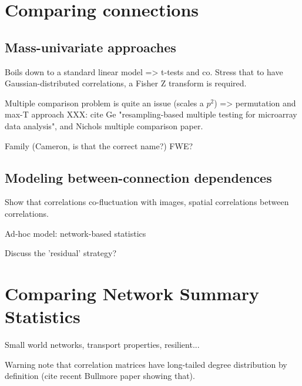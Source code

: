 \documentclass[5p]{elsarticle}
\begin{document}

\section{Comparing connections}

\subsection{Mass-univariate approaches}

Boils down to a standard linear model => t-tests and co.
Stress that to have Gaussian-distributed correlations, a Fisher Z
transform is required.

Multiple comparison problem is quite an issue (scales a $p^2$) =>
permutation and max-T approach XXX: cite Ge
"resampling-based multiple testing for microarray data analysis", and
Nichols multiple comparison paper.

Family (Cameron, is that the correct name?) FWE?

\subsection{Modeling between-connection dependences}

Show that correlations co-fluctuation with images, spatial correlations between correlations.

Ad-hoc model: network-based statistics \cite{zalesky2010}

Discuss the 'residual' strategy?
\cite{varoquaux2010b}


\section{Comparing Network Summary Statistics}

Small world networks, transport properties, resilient...

Warning note that correlation matrices have long-tailed degree
distribution by definition (cite recent Bullmore paper showing that).

\end{document}
